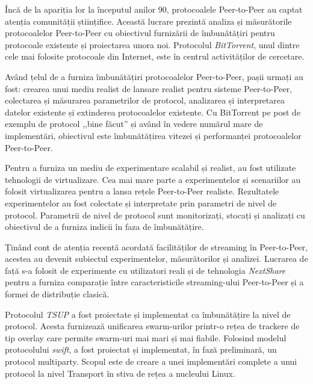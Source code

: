 \documentclass[11pt,a4paper]{article}
\begin{document}
\hrulefill

Încă de la apariția lor la începutul anilor 90, protocoalele Peer-to-Peer au
captat atenția comunității științifice. Această lucrare prezintă analiza și
măsurătorile protocoalelor Peer-to-Peer cu obiectivul furnizării de
îmbunătățiri pentru protocoale existente și proiectarea unora noi. Protocolul
\textit{BitTorrent}, unul dintre cele mai folosite protocoale din Internet,
este în centrul activităților de cercetare.

Având țelul de a furniza îmbunătățiri protocoalelor Peer-to-Peer, pașii urmați
au fost: crearea unui mediu realist de lansare realist pentru sisteme
Peer-to-Peer, colectarea și măsurarea parametrilor de protocol, analizarea și
interpretarea datelor existente și extinderea protocoalelor existente. Cu
BitTorrent pe post de exemplu de protocol ,,bine făcut'' și având în vedere
numărul mare de implementări, obiectivul este îmbunătățirea vitezei și
performanței protocoalelor Peer-to-Peer.

Pentru a furniza un mediu de experimentare scalabil și realist, au fost
utilizate tehnologii de virtualizare. Cea mai mare parte a experimentelor și
scenariilor au folosit virtualizarea pentru a lansa rețele Peer-to-Peer
realiste. Rezultatele experimentelor au fost colectate și interpretate prin
parametri de nivel de protocol. Parametrii de nivel de protocol sunt
monitorizați, stocați și analizați cu obiectivul de a furniza indicii în faza
de îmbunătățire.

Ținând cont de atenția recentă acordată facilităților de streaming în
Peer-to-Peer, acestea au devenit subiectul experimentelor, măsurătorilor și
analizei. Lucrarea de față s-a folosit de experimente cu utilizatori reali și
de tehnologia \textit{NextShare} pentru a furniza comparație între
caracteristicile streaming-ului Peer-to-Peer și a formei de distribuție
clasică.

Protocolul \textit{TSUP} a fost proiectate și implementat ca îmbunătățire la
nivel de protocol. Acesta furnizează unificarea swarm-urilor printr-o rețea de
trackere de tip overlay care permite swarm-uri mai mari și mai fiabile.
Folosind modelul protocolului \textit{swift}, a fost proiectat și implementat,
în fază preliminară, un protocol multiparty. Scopul este de creare a unei
implementări complete a unui protocol la nivel Transport în stiva de rețea a
nucleului Linux.
\end{document}
